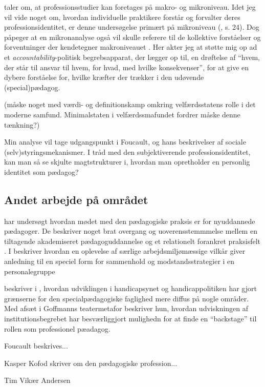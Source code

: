 \citeauthor{molanderProfesjonsstudierIntroduksjon2008} taler om, at  professionsstudier kan foretages på makro- og mikroniveau.
Idet jeg vil vide noget om, hvordan individuelle praktikere forstår og forvalter deres professionsidentitet, er denne undersøgelse primært på mikroniveau (\citeyear{molanderProfesjonsstudierIntroduksjon2008}, s. 24).
Dog påpeger \citeauthor{molanderProfesjonsstudierIntroduksjon2008} at en mikronanalyse også vil skulle referere til de kollektive forståelser og forventninger der kendetegner makroniveauet \autocite[s. 24]{molanderProfesjonsstudierIntroduksjon2008}.
Her akter jeg at støtte mig op ad et \textit{accountability}-politisk begrebsapparat, der lægger op til, en drøftelse af “hvem, der står til ansvar til hvem, for hvad, med hvilke konsekvenser”, for at give en dybere forståelse for, hvilke kræfter der trækker i den udøvende (special)pædagog.

(måske noget med værdi- og definitionskamp omkring velfærdsstatens rolle i det moderne samfund. Minimalstaten i velfærdssmafundet fordrer måske denne tænkning?) 

Min analyse vil tage udgangspunkt i Foucault, og hans beskrivelser af sociale (selv)styringsmekanismer. I tråd med den subjektiverende professionsidentitet, kan man så se skjulte magtstrukturer i, hvordan man opretholder en personlig identitet som pædagog?

\subsection{Andet arbejde på området}
\citeauthor{nielsenAttraktivPaPapiret2017} har undersøgt hvordan mødet med den pædagogiske praksis er for nyuddannede pædagoger. De beskriver noget brat overgang og uoverensstemmmelse mellem en tiltagende akademiseret pædagoguddannelse og et relationelt forankret praksisfelt \autocite{nielsenAttraktivPaPapiret2017}.
I  beskriver \citeauthor{dreyerespersenBekymrendeIdentiteterAnbragte2010} hvordan en oplevelse af særlige arbejdsmiljømæssige vilkår giver anledning til en speciel form for sammenhold og modstandsstrategier i en personalegruppe \autocite{dreyerespersenBekymrendeIdentiteterAnbragte2010}

\citeauthor{hurFrigorelsensMagt2015} beskriver i , hvordan udviklingen i handicapsynet og handicappolitiken har gjort grænserne for den specialpædagogiske faglighed mere diffus på nogle områder.
Med afsæt i Goffmanns teatermetafor beskriver hun, hvordan udviskningen af institutionsbegrebet har besværliggjort mulighedn for at finde en “backstage” til rollen som professionel pæadagog.

Foucault beskrives...


Kasper Kofod skriver om den pædagogiske profession...

Tim Vikær Andersen

